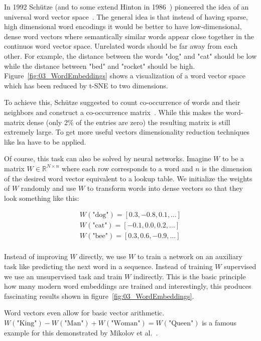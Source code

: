 In 1992 Schütze {(and to some extend Hinton in 1986~\cite{Hinton1986})} pioneered the idea of an universal word vector space~\cite{Schutze1992}. The general idea is that instead of having sparse, high dimensional word encodings it would be better to have low-dimensional, dense word vectors where semantically similar words appear close together in the continuos word vector space. Unrelated words should be far away from each other. For example, the distance between the words "dog" and "cat" should be low while the distance between "bed" and "rocket" should be high. Figure~\ref{fig:03_WordEmbeddings} shows a visualization of a word vector space which has been reduced by t-SNE to two dimensions.
\medskip

To achieve this, Schütze suggested to count co-occurrence of words and their neighbors and construct a co-occurrence matrix~\cite{Schutze1992}. While this makes the word-matrix dense {(only 2\% of the entries are zero)} the resulting matrix is still extremely large. To get more useful vectors dimensionality reduction techniques like \gls{lsa} have to be applied.
\medskip

Of course, this task can also be solved by neural networks. Imagine $W$ to be a matrix $W \in \mathbb{R}^{N\times n}$ where each row corresponds to a word and $n$ is the dimension of the desired word vector equivalent to a lookup table. We initialize the weights of $W$ randomly and use $W$ to transform words into dense vectors so that they look something like this:

\begin{equation*}
	\begin{aligned}
		W(\text{"dog"}) = [0.3, -0.8, 0.1, \dots] \\
		W(\text{"cat"}) = [-0.1, 0.0, 0.2, \dots] \\
		W(\text{"bee"}) = [0.3, 0.6, -0.9, \dots] \\
	\end{aligned}
\end{equation*}

Instead of improving $W$ directly, we use $W$ to train a network on an auxiliary task like predicting the next word in a sequence. Instead of training $W$ supervised we use an unsupervised task and train $W$ indirectly. This is the basic principle how many modern word embeddings are trained and interestingly, this produces fascinating results shown in figure~\ref{fig:03_WordEmbeddings}.
\medskip

Word vectors even allow for basic vector arithmetic. $W(\text{"King"})-W(\text{"Man"})+W(\text{"Woman"})=W(\text{"Queen"})$ is a famous example for this demonstrated by Mikolov et al.~\cite{Mikolov2013d}.
\medskip

